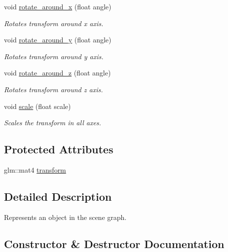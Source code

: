 \begin{DoxyCompactItemize}
void \mbox{\hyperlink{classoglsl_1_1_node_ab3463958740710e6af2a502ecd10d5ba}{rotate\+\_\+around\+\_\+x}} (float angle)
\begin{DoxyCompactList}\small\item\em Rotates transform around x axis. \end{DoxyCompactList}\item 
void \mbox{\hyperlink{classoglsl_1_1_node_a18862e40a37f13088bf454eb113e42d6}{rotate\+\_\+around\+\_\+y}} (float angle)
\begin{DoxyCompactList}\small\item\em Rotates transform around y axis. \end{DoxyCompactList}\item 
void \mbox{\hyperlink{classoglsl_1_1_node_afcd334ef611ba394879cd32be71d4c43}{rotate\+\_\+around\+\_\+z}} (float angle)
\begin{DoxyCompactList}\small\item\em Rotates transform around z axis. \end{DoxyCompactList}\item 
void \mbox{\hyperlink{classoglsl_1_1_node_a331a350e8311a310a77a109e6af6d135}{scale}} (float scale)
\begin{DoxyCompactList}\small\item\em Scales the transform in all axes. \end{DoxyCompactList}\end{DoxyCompactItemize}
\subsection*{Protected Attributes}
\begin{DoxyCompactItemize}
\item 
glm\+::mat4 \mbox{\hyperlink{classoglsl_1_1_node_a6b7251cdc6e62932d29f9094347b9e01}{transform}}
\end{DoxyCompactItemize}


\subsection{Detailed Description}
Represents an object in the scene graph. 

\subsection{Constructor \& Destructor Documentation}
\mbox{\label{classoglsl_1_1_node_a485089d967532e58ecb6eaa1bcbb1185}} 
